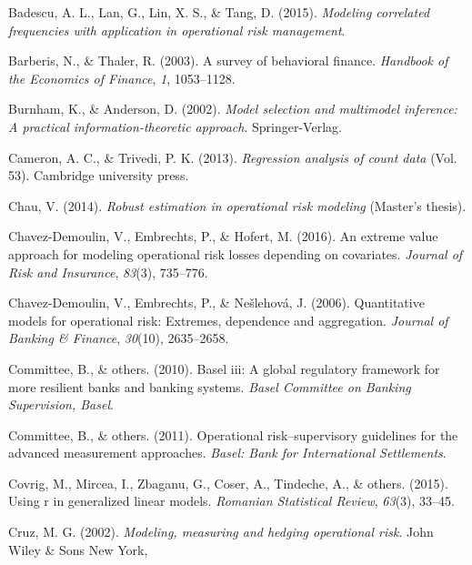 \documentclass{DissertateUSU}
\begin{document}
\leavevmode\hypertarget{ref-badescu2015modeling}{}%
Badescu, A. L., Lan, G., Lin, X. S., \& Tang, D. (2015). \emph{Modeling
correlated frequencies with application in operational risk management}.

\leavevmode\hypertarget{ref-barberis2003survey}{}%
Barberis, N., \& Thaler, R. (2003). A survey of behavioral finance.
\emph{Handbook of the Economics of Finance}, \emph{1}, 1053--1128.

\leavevmode\hypertarget{ref-Burnham2002}{}%
Burnham, K., \& Anderson, D. (2002). \emph{Model selection and
multimodel inference: A practical information-theoretic approach}.
Springer-Verlag.

\leavevmode\hypertarget{ref-cameron2013regression}{}%
Cameron, A. C., \& Trivedi, P. K. (2013). \emph{Regression analysis of
count data} (Vol. 53). Cambridge university press.

\leavevmode\hypertarget{ref-chau2014robust}{}%
Chau, V. (2014). \emph{Robust estimation in operational risk modeling}
(Master's thesis).

\leavevmode\hypertarget{ref-chavez2016extreme}{}%
Chavez-Demoulin, V., Embrechts, P., \& Hofert, M. (2016). An extreme
value approach for modeling operational risk losses depending on
covariates. \emph{Journal of Risk and Insurance}, \emph{83}(3),
735--776.

\leavevmode\hypertarget{ref-chavez2006quantitative}{}%
Chavez-Demoulin, V., Embrechts, P., \& Nešlehová, J. (2006).
Quantitative models for operational risk: Extremes, dependence and
aggregation. \emph{Journal of Banking \& Finance}, \emph{30}(10),
2635--2658.

\leavevmode\hypertarget{ref-basel2010basel}{}%
Committee, B., \& others. (2010). Basel iii: A global regulatory
framework for more resilient banks and banking systems. \emph{Basel
Committee on Banking Supervision, Basel}.

\leavevmode\hypertarget{ref-basel2011operational}{}%
Committee, B., \& others. (2011). Operational risk--supervisory
guidelines for the advanced measurement approaches. \emph{Basel: Bank
for International Settlements}.

\leavevmode\hypertarget{ref-covrig2015using}{}%
Covrig, M., Mircea, I., Zbaganu, G., Coser, A., Tindeche, A., \& others.
(2015). Using r in generalized linear models. \emph{Romanian Statistical
Review}, \emph{63}(3), 33--45.

\leavevmode\hypertarget{ref-cruz2002modeling}{}%
Cruz, M. G. (2002). \emph{Modeling, measuring and hedging operational
risk}. John Wiley \& Sons New York,
\end{document}
